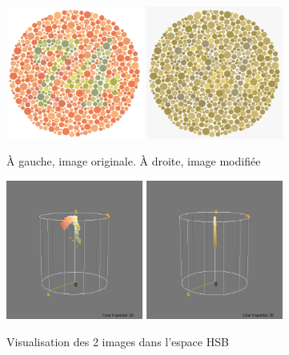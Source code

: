 \documentclass[a4paper]{article}
\begin{document}
\begin{figure}[H]
\begin{center}
\includegraphics[width=170px]{../base/cas_3_dalton74.png}
\includegraphics[width=170px]{../base/cas3_dalton74_question4_1.png}
\end{center}
\caption{À gauche, image originale. À droite, image modifiée}
\end{figure}

\begin{figure}[H]
\begin{center}
\includegraphics[width=170px]{../resultats/e4_visu_original.png}
\includegraphics[width=170px]{../resultats/e4_visu_modif.png}
\end{center}
\caption{Visualisation des 2 images dans l'espace HSB}
\end{figure}
\end{document}
